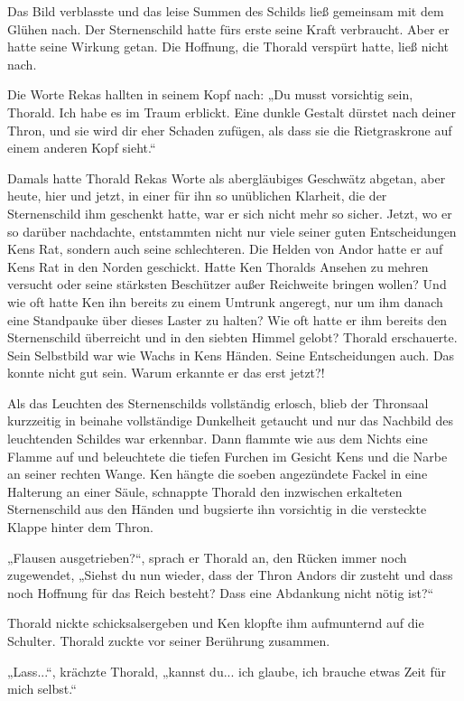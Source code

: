 Das Bild verblasste und das leise Summen des Schilds ließ gemeinsam mit dem Glühen nach. Der Sternenschild hatte fürs erste seine Kraft verbraucht. Aber er hatte seine Wirkung getan. Die Hoffnung, die Thorald verspürt hatte, ließ nicht nach.

Die Worte Rekas hallten in seinem Kopf nach: „Du musst vorsichtig sein, Thorald. Ich habe es im Traum erblickt. Eine dunkle Gestalt dürstet nach deiner Thron, und sie wird dir eher Schaden zufügen, als dass sie die Rietgraskrone auf einem anderen Kopf sieht.“

Damals hatte Thorald Rekas Worte als abergläubiges Geschwätz abgetan, aber heute, hier und jetzt, in einer für ihn so unüblichen Klarheit, die der Sternenschild ihm geschenkt hatte, war er sich nicht mehr so sicher. Jetzt, wo er so darüber nachdachte, entstammten nicht nur viele seiner guten Entscheidungen Kens Rat, sondern auch seine schlechteren. Die Helden von Andor hatte er auf Kens Rat in den Norden geschickt. Hatte Ken Thoralds Ansehen zu mehren versucht oder seine stärksten Beschützer außer Reichweite bringen wollen? Und wie oft hatte Ken ihn bereits zu einem Umtrunk angeregt, nur um ihm danach eine Standpauke über dieses Laster zu halten? Wie oft hatte er ihm bereits den Sternenschild überreicht und in den siebten Himmel gelobt? Thorald erschauerte. Sein Selbstbild war wie Wachs in Kens Händen. Seine Entscheidungen auch. Das konnte nicht gut sein. Warum erkannte er das erst jetzt?!

Als das Leuchten des Sternenschilds vollständig erlosch, blieb der Thronsaal kurzzeitig in beinahe vollständige Dunkelheit getaucht und nur das Nachbild des leuchtenden Schildes war erkennbar. Dann flammte wie aus dem Nichts eine Flamme auf und beleuchtete die tiefen Furchen im Gesicht Kens und die Narbe an seiner rechten Wange. Ken hängte die soeben angezündete Fackel in eine Halterung an einer Säule, schnappte Thorald den inzwischen erkalteten Sternenschild aus den Händen und bugsierte ihn vorsichtig in die versteckte Klappe hinter dem Thron.

„Flausen ausgetrieben?“, sprach er Thorald an, den Rücken immer noch zugewendet, „Siehst du nun wieder, dass der Thron Andors dir zusteht und dass noch Hoffnung für das Reich besteht? Dass eine Abdankung nicht nötig ist?“

Thorald nickte schicksalsergeben und Ken klopfte ihm aufmunternd auf die Schulter. Thorald zuckte vor seiner Berührung zusammen.

„Lass...“, krächzte Thorald, „kannst du... ich glaube, ich brauche etwas Zeit für mich selbst.“


